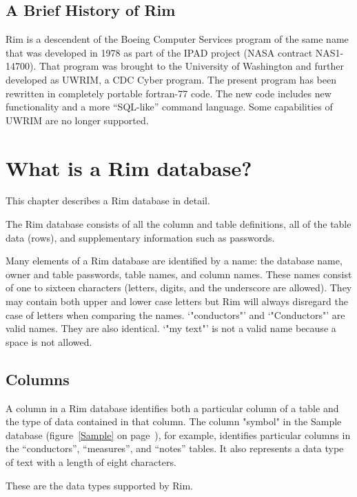 \section{A Brief History of Rim}
Rim is a descendent of the Boeing Computer Services program
of the same name that was developed in 1978 as part of the IPAD project
(NASA contract NAS1-14700).
That program was brought
to the University of Washington and further developed
as UWRIM, a CDC Cyber program.
The present program has been rewritten in completely portable
fortran-77 code.  The new code includes new functionality
and a more ``SQL-like'' command language.
Some capabilities of UWRIM are no longer supported.
 
%
%
\chapter{What is a Rim database?}
 
 
This chapter describes a Rim database in detail.
 
 
The Rim database consists of all the column and table
definitions, all of the table data (rows),
and supplementary information such as passwords.
 
Many elements of a Rim database are identified by a name:
  the database name,
  owner and table passwords,
  table names, and
  column names.
These names consist of one to sixteen
characters (letters, digits, and the underscore are allowed).
They may contain both upper and lower case letters but Rim
will always disregard the case of letters when comparing the names.
`"conductors"' and `"Conductors"' are valid names.  They are also
identical.  `"my text"' is not a valid name because
a space is not allowed.
 
\section{Columns}
A column in a Rim database identifies both a particular
column of a table and the type of data contained in that
column.  The column "symbol" in the Sample database
(figure~\ref{Sample} on page~\pageref{Sample}),
for example, identifies particular
columns in the ``conductors'', ``measures'', and ``notes'' tables.
It also represents a data type of text with a length of
eight characters.
 
These are the data types supported by Rim.
 
